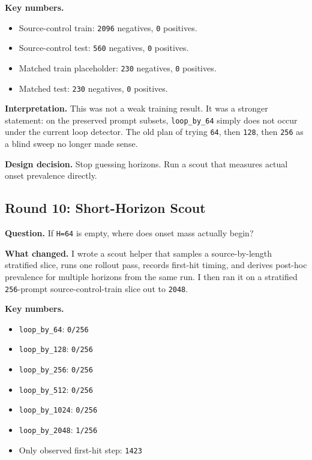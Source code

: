 \documentclass[11pt]{article}
\begin{document}
\textbf{Key numbers.}
\begin{itemize}
  \item Source-control train: \texttt{2096} negatives, \texttt{0} positives.
  \item Source-control test: \texttt{560} negatives, \texttt{0} positives.
  \item Matched train placeholder: \texttt{230} negatives, \texttt{0} positives.
  \item Matched test: \texttt{230} negatives, \texttt{0} positives.
\end{itemize}

\textbf{Interpretation.} This was not a weak training result. It was a stronger statement: on the preserved prompt subsets, \texttt{loop\_by\_64} simply does not occur under the current loop detector. The old plan of trying \texttt{64}, then \texttt{128}, then \texttt{256} as a blind sweep no longer made sense.

\textbf{Design decision.} Stop guessing horizons. Run a scout that measures actual onset prevalence directly.

\subsection*{Round 10: Short-Horizon Scout}
\textbf{Question.} If \texttt{H=64} is empty, where does onset mass actually begin?

\textbf{What changed.} I wrote a scout helper that samples a source-by-length stratified slice, runs one rollout pass, records first-hit timing, and derives post-hoc prevalence for multiple horizons from the same run. I then ran it on a stratified \texttt{256}-prompt source-control-train slice out to \texttt{2048}.

\textbf{Key numbers.}
\begin{itemize}
  \item \texttt{loop\_by\_64}: \texttt{0/256}
  \item \texttt{loop\_by\_128}: \texttt{0/256}
  \item \texttt{loop\_by\_256}: \texttt{0/256}
  \item \texttt{loop\_by\_512}: \texttt{0/256}
  \item \texttt{loop\_by\_1024}: \texttt{0/256}
  \item \texttt{loop\_by\_2048}: \texttt{1/256}
  \item Only observed first-hit step: \texttt{1423}
\end{itemize}
\end{document}
